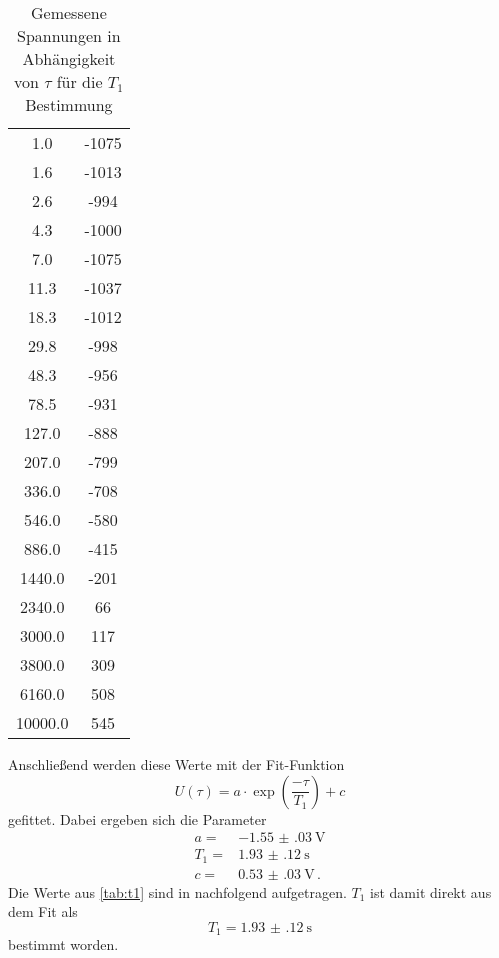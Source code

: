 \begin{table}
    \centering
    \caption{Gemessene Spannungen in Abhängigkeit von $\tau$ für die $T_1$ Bestimmung}
    \label{tab:t1}
    \begin{tabular}{S[table-format=5.1] S[table-format=-4.0]}
        \toprule
        \tableSI{\tau}{\milli\second} &   \\
         &  -1075  \\
        1.6 & -1013 \\
        2.6 & -994 \\
        4.3 & -1000 \\
        7.0 & -1075 \\
        11.3 & -1037 \\
        18.3 & -1012 \\
        29.8 & -998 \\
        48.3 & -956 \\
        78.5 & -931 \\
        127.0 & -888 \\
        207.0 & -799 \\
        336.0 & -708 \\
        546.0 & -580 \\
        886.0 & -415 \\
        1440.0 & -201 \\
        2340.0 & 66 \\
        3000.0 & 117 \\
        3800.0 & 309 \\
        6160.0 & 508 \\
        10000.0 & 545 \\
        \bottomrule
    \end{tabular}
\end{table}

Anschließend werden diese Werte mit der Fit-Funktion 
\begin{equation}
    U(\tau) = a \cdot \exp(\frac{- \tau}{T_1}) + c 
    \label{eq:fit_t1}
\end{equation}
gefittet.
Dabei ergeben sich die Parameter 
\begin{align*}
    a =& \SI{-1.55(03)}{\volt} \\
    T_1 =& \SI{1.93(12)}{\second} \\
    c =& \SI{0.53(03)}{\volt} \, .
\end{align*}
Die Werte aus \autoref{tab:t1} sind in nachfolgend aufgetragen.
$T_1$ ist damit direkt aus dem Fit als 
\begin{equation*}
    T_1 = \SI{1.93(12)}{\second}
\end{equation*}
bestimmt worden.


